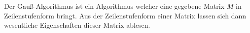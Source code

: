 Der Gauß-Algorithmus ist ein Algorithmus welcher eine gegebene Matrix $M$ in Zeilenstufenform bringt.
Aus der Zeilenstufenform einer Matrix lassen sich dann wesentliche Eigenschaften dieser Matrix ablesen.